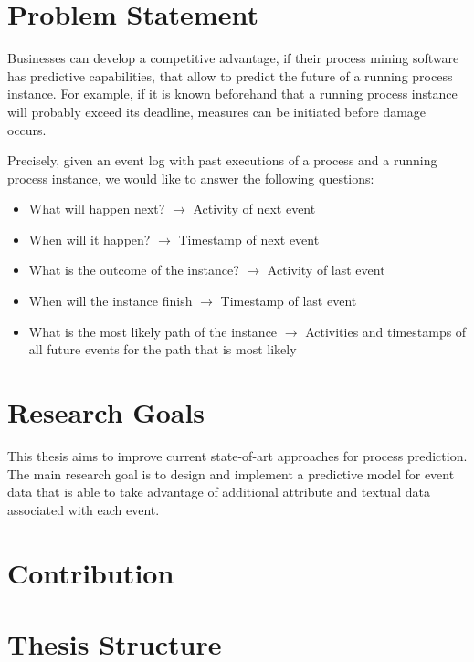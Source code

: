 \section{Problem Statement}

Businesses can develop a competitive advantage, if their process mining software has predictive capabilities, that allow to predict the future of a running process instance.
For example, if it is known beforehand that a running process instance will probably exceed
its deadline, measures can be initiated before damage occurs.

Precisely, given an event log with past executions of a process and a running process instance, we would like to answer the following questions:

\begin{itemize}
	\item What will happen next? $\rightarrow$ Activity of next event
	\item When will it happen? $\rightarrow$ Timestamp of next event
	\item What is the outcome of the instance? $\rightarrow$ Activity of last event
	\item When will the instance finish $\rightarrow$ Timestamp of last event
	\item What is the most likely path of the instance $\rightarrow$  Activities and timestamps of all future events for the path that is most likely
\end{itemize}



\section{Research Goals}

This thesis aims to improve current state-of-art approaches for process prediction.
The main research goal is to design and implement a predictive model for event data that is able to take advantage of additional attribute and textual data associated with each event. 

\section{Contribution}



\section{Thesis Structure}

